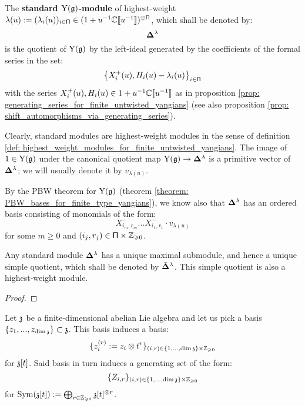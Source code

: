         \begin{definition} \label{def: standard_modules_for_finite_untwisted_yangians}
            The \textbf{standard $\mathrm{Y}(\mathfrak{g})$-module} of highest-weight $\lambda(u) := ( \lambda_i(u) )_{i \in \mathsf{\Pi}} \in (1 + u^{-1} \mathbb{C}[\![u^{-1}]\!])^{\oplus \mathsf{\Pi}}$, which shall be denoted by:
                $$\mathbf{ \Delta }^{\lambda}$$
            is the quotient of $\mathrm{Y}(\mathfrak{g})$ by the left-ideal generated by the coefficients of the formal series in the set:
                $$\left\{ X_i^+(u), H_i(u) - \lambda_i(u) \right\}_{i \in \mathsf{\Pi}}$$
            with the series $X_i^+(u), H_i(u) \in 1 + u^{-1} \mathbb{C}[\![u^{-1}]\!]$ as in proposition \ref{prop: generating_series_for_finite_untwisted_yangians} (see also proposition \ref{prop: shift_automorphisms_via_generating_series}).
        \end{definition}
        Clearly, standard modules are highest-weight modules in the sense of definition \ref{def: highest_weight_modules_for_finite_untwisted_yangians}. The image of $1 \in \mathrm{Y}(\mathfrak{g})$ under the canonical quotient map $\mathrm{Y}(\mathfrak{g}) \to \mathbf{ \Delta }^{\lambda}$ is a primitive vector of $\mathbf{ \Delta }^{\lambda}$; we will usually denote it by $v_{\lambda(u)}$.

        By the PBW theorem for $\mathrm{Y}(\mathfrak{g})$ (theorem \ref{theorem: PBW_bases_for_finite_type_yangians}), we know also that $\mathbf{ \Delta }^{\lambda}$ has an ordered basis consisting of monomials of the form:
            $$X^-_{i_m, r_m} ... X^-_{i_1, r_1} \cdot v_{\lambda(u)}$$
        for some $m \geq 0$ and $(i_j, r_j) \in \simpleroots \x \Z_{\geq 0}$.

        \begin{lemma} \label{lemma: unqiue_simple_quotients_of_finite_untwisted_yangian_standard_modules}
            Any standard module $\mathbf{ \Delta }^{\lambda}$ has a unique maximal submodule, and hence a unique simple quotient, which shall be denoted by $\bar{ \mathbf{ \Delta } }^{\lambda}$. This simple quotient is also a highest-weight module.
        \end{lemma}
            \begin{proof}
                
            \end{proof}

        Let $\mathfrak{z}$ be a finite-dimensional abelian Lie algebra and let us pick a basis $\{z_1, ..., z_{\dim \mathfrak{z}}\} \subset \mathfrak{z}$. This basis induces a basis:
            $$\{ z_i^{(r)} := z_i \tensor t^r \}_{(i, r) \in \{1, ..., \dim \z\} \x \Z_{\geq 0}}$$
        for $\mathfrak{z}[t]$. Said basis in turn induces a generating set of the form:
            $$\{ Z_{i, r} \}_{(i, r) \in \{1, ..., \dim \z\} \x \Z_{\geq 0}}$$
        for $\Sym(\z[t]) := \bigoplus_{r \in \Z_{\geq 0}} \z[t]^{\tensor r}$.
        
